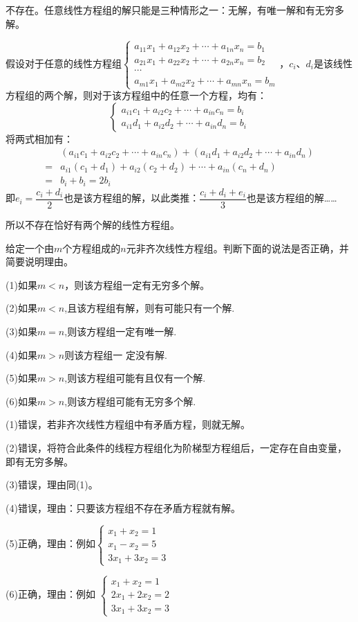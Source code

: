 \documentclass[a4paper]{report}
\begin{document}
\begin{jie}
不存在。任意线性方程组的解只能是三种情形之一：无解，有唯一解和有无穷多解。

假设对于任意的线性方程组$
\begin{cases}
a_{11}x_{1}+a_{12}x_{2}+\cdots+a_{1n}x_{n}=b_1\\
a_{21}x_{1}+a_{22}x_{2}+\cdots+a_{2n}x_{n}=b_2\\
\cdots\\
a_{m1}x_{1}+a_{m2}x_{2}+\cdots+a_{mn}x_{n}=b_m \end{cases}
$，$c_i$、$d_i$是该线性方程组的两个解，则对于该方程组中的任意一个方程，均有：
\begin{equation*}
  \begin{cases}
   a_{i1}c_{1}+a_{i2}c_{2}+\cdots+a_{in}c_{n}=b_i\\
   a_{i1}d_{1}+a_{i2}d_{2}+\cdots+a_{in}d_{n}=b_i
  \end{cases}
\end{equation*}
将两式相加有：
\begin{align*}
&(a_{i1}c_{1}+a_{i2}c_{2}+\cdots+a_{in}c_{n})+(a_{i1}d_{1}+a_{i2}d_{2}+\cdots+a_{in}d_{n})\\
=&a_{i1}(c_{1}+d_{1})+a_{i2}(c_{2}+d_{2})+\cdots+a_{in}(c_{n}+d_{n})\\
=&b_i + b_i =2b_i
\end{align*}
即$e_i=\dfrac{c_i+d_i}{2}$也是该方程组的解，以此类推：$\dfrac{c_i+d_i+e_i}{3}$也是该方程组的解……

所以不存在恰好有两个解的线性方程组。
\end{jie}

\EX 给定一个由$m$个方程组成的$n$元非齐次线性方程组。判断下面的说法是否正确，并简要说明理由。

(1)如果$m<n$，则该方程组一定有无穷多个解。

(2)如果$m< n$,且该方程组有解，则有可能只有一个解.

(3)如果$m=n$,则该方程组一定有唯一解.

(4)如果$m>n$则该方程组一 定没有解.

(5)如果$m> n$,则该方程组可能有且仅有一个解.

(6)如果$m> n$,则该方程组可能有无穷多个解.

\begin{jie}
(1)错误，若非齐次线性方程组中有矛盾方程，则就无解。

(2)错误，将符合此条件的线程方程组化为阶梯型方程组后，一定存在自由变量，即有无穷多解。

(3)错误，理由同(1)。

(4)错误，理由：只要该方程组不存在矛盾方程就有解。

(5)正确，理由：例如$
\begin{cases}
x_1+x_2=1\\
x_1-x_2=5\\
3x_1+3x_2=3
\end{cases}
$

(6)正确，理由：例如
$
\begin{cases}
x_1+x_2=1\\
2x_1+2x_2=2\\
3x_1+3x_2=3
\end{cases}
$
\end{jie}
\end{document}
